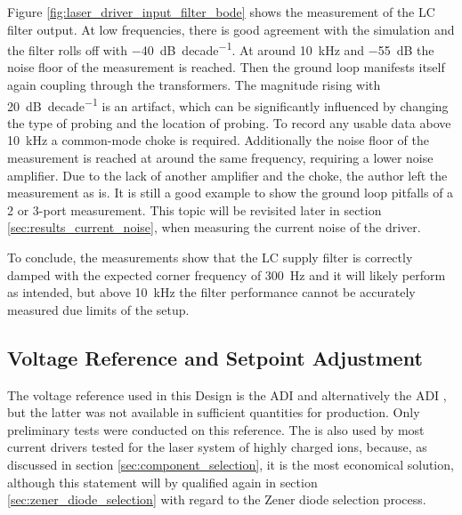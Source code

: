 Figure \ref{fig:laser_driver_input_filter_bode} shows the measurement of the LC filter output. At low frequencies, there is good agreement with the simulation and the filter rolls off with \qty{-40}{\dB \per decade}. At around \qty{10}{\kHz} and \qty{-55}{\dB} the noise floor of the measurement is reached. Then the ground loop manifests itself again coupling through the transformers. The magnitude rising with \qty{20}{\dB \per decade} is an artifact, which can be significantly influenced by changing the type of probing and the location of probing. To record any usable data above \qty{10}{\kHz} a common-mode choke is required. Additionally the noise floor of the measurement is reached at around the same frequency, requiring a lower noise amplifier. Due to the lack of another amplifier and the choke, the author left the measurement as is. It is still a good example to show the ground loop pitfalls of a 2 or 3-port measurement. This topic will be revisited later in section \ref{sec:results_current_noise}, when measuring the current noise of the driver.

To conclude, the measurements show that the LC supply filter is correctly damped with the expected corner frequency of \qty{300}{\Hz} and it will likely perform as intended, but above \qty{10}{\kHz} the filter performance cannot be accurately measured due limits of the setup.

\subsection{Voltage Reference and Setpoint Adjustment}%
\label{sec:voltage_reference}
The voltage reference used in this Design is the ADI  and alternatively the ADI , but the latter was not available in sufficient quantities for production. Only preliminary tests were conducted on this reference. The  is also used by most current drivers tested for the laser system of highly charged ions, because, as discussed in section \ref{sec:component_selection}, it is the most economical solution, although this statement will by qualified again in section \ref{sec:zener_diode_selection} with regard to the Zener diode selection process.

